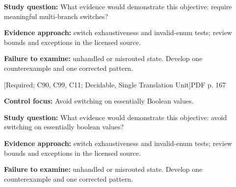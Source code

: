 \documentclass[10pt,letterpaper]{article}
\begin{document}
\textbf{Study question:} What evidence would demonstrate this objective: require meaningful multi-branch switches?\par
\textbf{Evidence approach:} switch exhaustiveness and invalid-enum tests; review bounds and exceptions in the licensed source.\par
\textbf{Failure to examine:} unhandled or misrouted state. Develop one counterexample and one corrected pattern.\par
\smallskip
{}
 \textsf{\footnotesize [Required; C90, C99, C11; Decidable, Single Translation Unit]}\hfill{\footnotesize PDF p. 167}\par
\textbf{Control focus:} Avoid switching on essentially Boolean values.\par
\textbf{Study question:} What evidence would demonstrate this objective: avoid switching on essentially boolean values?\par
\textbf{Evidence approach:} switch exhaustiveness and invalid-enum tests; review bounds and exceptions in the licensed source.\par
\textbf{Failure to examine:} unhandled or misrouted state. Develop one counterexample and one corrected pattern.\par
\smallskip
\end{document}
